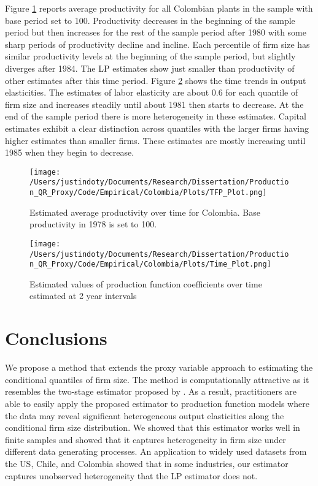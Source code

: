 \documentclass[11pt]{article}
\begin{document}
Figure \ref{fig:COLpgrowth} reports average productivity for all Colombian plants in the sample with base period set to 100. Productivity decreases in the beginning of the sample period but then increases for the rest of the sample period after 1980 with some sharp periods of productivity decline and incline. Each percentile of firm size has similar productivity levels at the beginning of the sample period, but slightly diverges after 1984. The LP estimates show just smaller than productivity of other estimates after this time period. Figure \ref{fig:COLtimecoef} shows the time trends in output elasticities. The estimates of labor elasticity are about 0.6 for each quantile of firm size and increases steadily until about 1981 then starts to decrease. At the end of the sample period there is more heterogeneity in these estimates. Capital estimates exhibit a clear distinction across quantiles with the larger firms having higher estimates than smaller firms. These estimates are mostly increasing until 1985 when they begin to decrease.

\begin{figure}[H]
\centering
\texttt{[image: /Users/justindoty/Documents/Research/Dissertation/Production\_QR\_Proxy/Code/Empirical/Colombia/Plots/TFP\_Plot.png]}
\caption{Estimated average productivity over time for Colombia. Base productivity in 1978 is set to 100.}
\label{fig:COLpgrowth}
\end{figure}

\begin{figure}[H]
\centering
\texttt{[image: /Users/justindoty/Documents/Research/Dissertation/Production\_QR\_Proxy/Code/Empirical/Colombia/Plots/Time\_Plot.png]}
\caption{Estimated values of production function coefficients over time estimated at 2 year intervals}
\label{fig:COLtimecoef}
\end{figure}

\section{Conclusions} \label{conclusion}

We propose a method that extends the proxy variable approach to estimating the conditional quantiles of firm size. The method is computationally attractive as it resembles the two-stage estimator proposed by \cite{Canay2011}. As a result, practitioners are able to easily apply the proposed estimator to production function models where the data may reveal significant heterogeneous output elasticities along the conditional firm size distribution. We showed that this estimator works well in finite samples and showed that it captures heterogeneity in firm size under different data generating processes. An application to widely used datasets from the US, Chile, and Colombia showed that in some industries, our estimator captures unobserved heterogeneity that the LP estimator does not.
\end{document}
